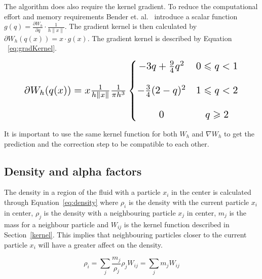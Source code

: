     The algorithm does also require the kernel gradient. To reduce the computational effort and memory requirements Bender et. al.~\cite{bender} introduce a scalar function $g(q) = \frac{\partial W_h}{\partial q} \cdot \frac{1}{h \left \| x \right \|}$. The gradient kernel is then calculated by $\partial W_h(q(x)) = x \cdot g(x)$. The gradient kernel is described by Equation ~\ref{eq:gradKernel}. 


    \begin{equation} \label{eq:gradKernel}
        \resizebox{0.88\linewidth}{!}{$
        \partial W_h(q(x)) =  x \frac{1}{h \left \| x \right \|} \frac{1}{\pi h^3} \left\{\begin{matrix}
        - 3q + \frac{9}{4}q^2 & 0 \leqslant q < 1 \\ 
        \\
        - \frac{3}{4}(2-q)^2 & 1 \leqslant q < 2\\ 
        \\
        0 & q \geqslant 2
        \end{matrix}\right.
        $}
    \end{equation}

    It is important to use the same kernel function for both $W_h$ and $\nabla W_h$ to get the prediction and the correction step to be compatible to each other.

\subsection{Density and alpha factors} \label{section:alpha}
    The density in a region of the fluid with a particle $x_i$ in the center is calculated through Equation~\ref{eq:density} where $\rho_i$ is the density with the current particle $x_i$ in center, $\rho_j$ is the density with a neighbouring particle $x_j$ in center, $m_j$ is the mass for a neighbour particle and $W_{ij}$ is the kernel function described in Section~\ref{kernel}. This implies that neighbouring particles closer to the current particle $x_i$ will have a greater affect on the density.    

    \begin{equation}\label{eq:density}
        \rho_i = \sum_j \frac{m_j}{\rho_j} \rho_j W_{ij} = \sum_j m_j W_{ij}
    \end{equation} 

